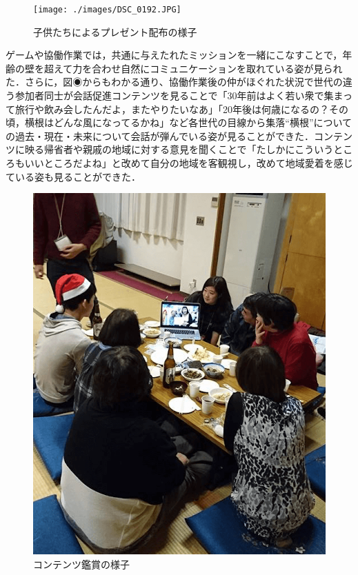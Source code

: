 \documentclass[a4paper]{jsarticle}
\begin{document}
\begin{figure}[H]
\begin{center}
  \texttt{[image: ./images/DSC\_0192.JPG]}
  \caption{子供たちによるプレゼント配布の様子}
  \label{chirstmas2}
\end{center}
\end{figure}

ゲームや協働作業では，共通に与えたれたミッションを一緒にこなすことで，年齢の壁を超えて力を合わせ自然にコミュニケーションを取れている姿が見られた．さらに，図◉からもわかる通り、協働作業後の仲がほぐれた状況で世代の違う参加者同士が会話促進コンテンツを見ることで「30年前はよく若い衆で集まって旅行や飲み会したんだよ，またやりたいなあ」「20年後は何歳になるの？その頃，横根はどんな風になってるかね」など各世代の目線から集落“横根”についての過去・現在・未来について会話が弾んでいる姿が見ることができた．コンテンツに映る帰省者や親戚の地域に対する意見を聞くことで「たしかにこういうところもいいところだよね」と改めて自分の地域を客観視し，改めて地域愛着を感じている姿も見ることができた．\par

\begin{figure}[H]
  \begin{center}
    \includegraphics[width=0.6\hsize]{./images/09.png}
    \caption{コンテンツ鑑賞の様子}
    \label{fig:tmu_hino}
  \end{center}
\end{figure}
\end{document}

